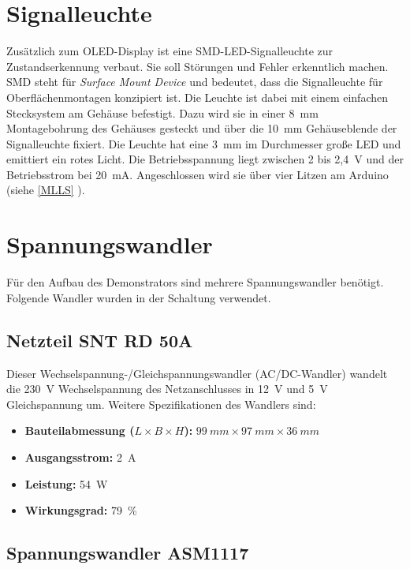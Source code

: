 \section{Signalleuchte}

Zusätzlich zum OLED-Display ist eine SMD-LED-Signalleuchte zur Zustandserkennung verbaut. Sie soll Störungen und Fehler erkenntlich machen. SMD steht für \emph{Surface Mount Device} und bedeutet, dass die Signalleuchte für Oberflächenmontagen konzipiert ist. Die Leuchte ist dabei mit einem einfachen Stecksystem am Gehäuse befestigt. Dazu wird sie in einer 8\ mm Montagebohrung des Gehäuses gesteckt und über die 10\ mm Gehäuseblende der Signalleuchte fixiert. Die Leuchte hat eine 3\ mm im Durchmesser große LED und emittiert ein rotes Licht. Die Betriebsspannung liegt zwischen 2 bis 2,4\ V und der Betriebsstrom bei 20\ mA. Angeschlossen wird sie über vier Litzen am Arduino (siehe \ref{MLLS} ).\cite{Mentor.2024}

\section{Spannungswandler}

Für den Aufbau des Demonstrators sind mehrere Spannungswandler benötigt. Folgende Wandler wurden in der Schaltung verwendet.

\subsection{Netzteil SNT RD 50A}

Dieser Wechselspannung-/Gleichspannungswandler (AC/DC-Wandler) wandelt die 230\ V Wechselspannung des Netzanschlusses in 12\ V  und 5\ V Gleichspannung um. 
Weitere Spezifikationen des Wandlers sind:
\begin{itemize}
	\item \textbf{Bauteilabmessung ($L\times B \times H$):} $99 \ mm \times 97 \ mm \times 36 \ mm$
	\item \textbf{Ausgangsstrom:} 2\ A
	\item \textbf{Leistung:} 54\ W
	\item \textbf{Wirkungsgrad:} 79\ \% 
\end{itemize} 
\cite{Meanwell.2019}

\subsection{Spannungswandler ASM1117}

